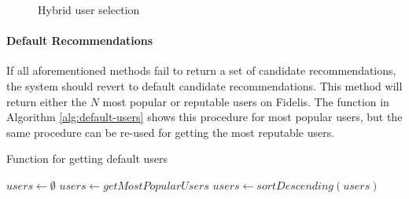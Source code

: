 \begin{figure}
\centering
{}
\caption{Hybrid user selection}
\label{fig:hybrid}
\end{figure}

\paragraph{Default Recommendations}
If all aforementioned methods fail to return a set of candidate recommendations, the system should revert to default candidate recommendations. This method will return either the $N$ most popular or reputable users on Fidelis. The function in Algorithm \ref{alg:default-users} shows this procedure for most popular users, but the same procedure can be re-used for getting the most reputable users.

\begin{algorithm}
\caption{Function for getting default users}
\label{alg:default-users}
\begin{algorithmic}[1]
	\State $users\gets \emptyset$
	\State $users\gets getMostPopularUsers$
	\State $users\gets sortDescending(users)$
	\State {}
\EndFunction
\end{algorithmic}
\end{algorithm}

